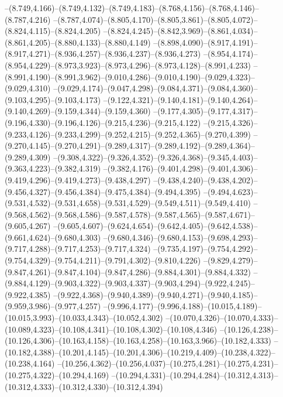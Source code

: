   --(8.749,4.166)--(8.749,4.132)--(8.749,4.183)--(8.768,4.156)--(8.768,4.146)--(8.787,4.216)%
  --(8.787,4.074)--(8.805,4.170)--(8.805,3.861)--(8.805,4.072)--(8.824,4.115)--(8.824,4.205)%
  --(8.824,4.245)--(8.842,3.969)--(8.861,4.034)--(8.861,4.205)--(8.880,4.133)--(8.880,4.149)%
  --(8.898,4.090)--(8.917,4.191)--(8.917,4.271)--(8.936,4.257)--(8.936,4.237)--(8.936,4.273)%
  --(8.954,4.174)--(8.954,4.229)--(8.973,3.923)--(8.973,4.296)--(8.973,4.128)--(8.991,4.233)%
  --(8.991,4.190)--(8.991,3.962)--(9.010,4.286)--(9.010,4.190)--(9.029,4.323)--(9.029,4.310)%
  --(9.029,4.174)--(9.047,4.298)--(9.084,4.371)--(9.084,4.360)--(9.103,4.295)--(9.103,4.173)%
  --(9.122,4.321)--(9.140,4.181)--(9.140,4.264)--(9.140,4.269)--(9.159,4.344)--(9.159,4.360)%
  --(9.177,4.305)--(9.177,4.317)--(9.196,4.330)--(9.196,4.126)--(9.215,4.236)--(9.215,4.122)%
  --(9.215,4.326)--(9.233,4.126)--(9.233,4.299)--(9.252,4.215)--(9.252,4.365)--(9.270,4.399)%
  --(9.270,4.145)--(9.270,4.291)--(9.289,4.317)--(9.289,4.192)--(9.289,4.364)--(9.289,4.309)%
  --(9.308,4.322)--(9.326,4.352)--(9.326,4.368)--(9.345,4.403)--(9.363,4.223)--(9.382,4.319)%
  --(9.382,4.176)--(9.401,4.298)--(9.401,4.306)--(9.419,4.296)--(9.419,4.273)--(9.438,4.297)%
  --(9.438,4.240)--(9.438,4.202)--(9.456,4.327)--(9.456,4.384)--(9.475,4.384)--(9.494,4.395)%
  --(9.494,4.623)--(9.531,4.532)--(9.531,4.658)--(9.531,4.529)--(9.549,4.511)--(9.549,4.410)%
  --(9.568,4.562)--(9.568,4.586)--(9.587,4.578)--(9.587,4.565)--(9.587,4.671)--(9.605,4.267)%
  --(9.605,4.607)--(9.624,4.654)--(9.642,4.405)--(9.642,4.538)--(9.661,4.624)--(9.680,4.303)%
  --(9.680,4.346)--(9.680,4.153)--(9.698,4.293)--(9.717,4.288)--(9.717,4.253)--(9.717,4.324)%
  --(9.735,4.197)--(9.754,4.292)--(9.754,4.329)--(9.754,4.211)--(9.791,4.302)--(9.810,4.226)%
  --(9.829,4.279)--(9.847,4.261)--(9.847,4.104)--(9.847,4.286)--(9.884,4.301)--(9.884,4.332)%
  --(9.884,4.129)--(9.903,4.322)--(9.903,4.337)--(9.903,4.294)--(9.922,4.245)--(9.922,4.385)%
  --(9.922,4.368)--(9.940,4.389)--(9.940,4.271)--(9.940,4.185)--(9.959,3.986)--(9.977,4.257)%
  --(9.996,4.177)--(9.996,4.188)--(10.015,4.189)--(10.015,3.993)--(10.033,4.343)--(10.052,4.302)%
  --(10.070,4.326)--(10.070,4.333)--(10.089,4.323)--(10.108,4.341)--(10.108,4.302)--(10.108,4.346)%
  --(10.126,4.238)--(10.126,4.306)--(10.163,4.158)--(10.163,4.258)--(10.163,3.966)--(10.182,4.333)%
  --(10.182,4.388)--(10.201,4.145)--(10.201,4.306)--(10.219,4.409)--(10.238,4.322)--(10.238,4.164)%
  --(10.256,4.362)--(10.256,4.037)--(10.275,4.281)--(10.275,4.231)--(10.275,4.322)--(10.294,4.169)%
  --(10.294,4.331)--(10.294,4.284)--(10.312,4.313)--(10.312,4.333)--(10.312,4.330)--(10.312,4.394)%
